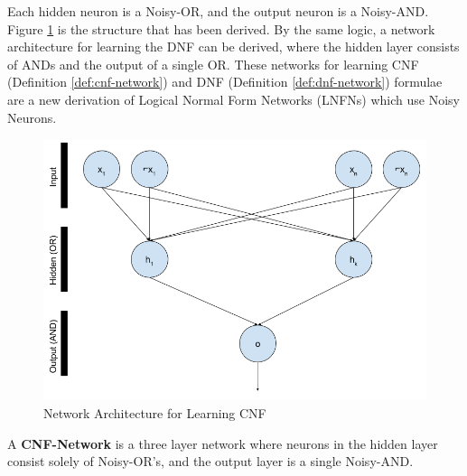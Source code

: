 \noindent
\begin{minipage}[t]{0.35\textwidth}
	\vspace{0px}
\hspace{0.0\textwidth}
Each hidden neuron is a Noisy-OR, and the output neuron is a Noisy-AND. Figure \ref{fig:cnf-network-structure} is the structure that has been derived. By the same logic, a network architecture for learning the DNF can be derived, where the hidden layer consists of ANDs and the output of a single OR. These networks for learning CNF (Definition \ref{def:cnf-network}) and DNF (Definition \ref{def:dnf-network}) formulae are a new derivation of Logical Normal Form Networks (LNFNs) \cite{herrmann1996backpropagation} which use Noisy Neurons.
\end{minipage}
\hspace{0.045\textwidth}
\begin{minipage}[t]{0.55\textwidth}
	\vspace{0px}
	\begin{figure}[H]
	\centering
	\begin{minipage}[b]{1.0\textwidth}
		\includegraphics[width=\textwidth]{CNF-Network-Structure.png}
		\caption{Network Architecture for Learning CNF}
		\label{fig:cnf-network-structure}
	\end{minipage}
	\hfill
\end{figure}
\end{minipage}

\theoremstyle{definition}
\begin{definition} \label{def:cnf-network}
A \textbf{CNF-Network} is a three layer network where neurons in the hidden layer consist solely of Noisy-OR's, and the output layer is a single Noisy-AND. 
\end{definition}

